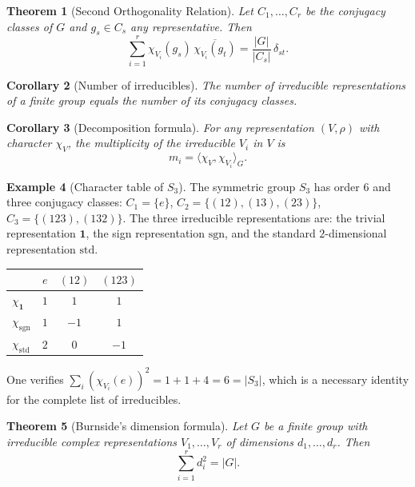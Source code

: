 \documentclass[12pt,a4paper]{amsart}
\newtheorem{theorem}{Theorem}[section]
\newtheorem{corollary}[theorem]{Corollary}
\theoremstyle{definition}
\newtheorem{example}[theorem]{Example}
\begin{document}
\begin{theorem}[Second Orthogonality Relation]
\label{thm:orth2}
Let $C_1,\ldots,C_r$ be the conjugacy classes of $G$ and $g_s \in C_s$ any
representative.  Then
\[
    \sum_{i=1}^{r} \chi_{V_i}(g_s)\,\overline{\chi_{V_i}(g_t)} = \frac{|G|}{|C_s|}\,\delta_{st}.
\]
\end{theorem}

\begin{corollary}[Number of irreducibles]
The number of irreducible representations of a finite group equals the number of
its conjugacy classes.
\end{corollary}

\begin{corollary}[Decomposition formula]
\label{cor:decomp}
For any representation $(V,\rho)$ with character $\chi_V$, the multiplicity of
the irreducible $V_i$ in $V$ is
\[
    m_i = \langle \chi_V, \chi_{V_i} \rangle_G.
\]
\end{corollary}

\begin{example}[Character table of $S_3$]
The symmetric group $S_3$ has order $6$ and three conjugacy classes:
$C_1 = \{e\}$, $C_2 = \{(12),(13),(23)\}$, $C_3 = \{(123),(132)\}$.
The three irreducible representations are: the trivial representation $\mathbf{1}$,
the sign representation $\mathrm{sgn}$, and the standard $2$-dimensional
representation $\mathrm{std}$.

\begin{center}
\begin{tabular}{lccc}
\toprule
 & $e$ & $(12)$ & $(123)$ \\
\midrule
$\chi_{\mathbf{1}}$ & $1$ & $1$ & $1$ \\
$\chi_{\mathrm{sgn}}$ & $1$ & $-1$ & $1$ \\
$\chi_{\mathrm{std}}$ & $2$ & $0$ & $-1$ \\
\bottomrule
\end{tabular}
\end{center}

One verifies $\sum_i (\chi_{V_i}(e))^2 = 1 + 1 + 4 = 6 = |S_3|$, which is a
necessary identity for the complete list of irreducibles.
\end{example}

\begin{theorem}[Burnside's dimension formula]
\label{thm:burnside_dim}
Let $G$ be a finite group with irreducible complex representations $V_1,\ldots,V_r$
of dimensions $d_1,\ldots,d_r$.  Then
\[
    \sum_{i=1}^{r} d_i^2 = |G|.
\]
\end{theorem}
\end{document}
